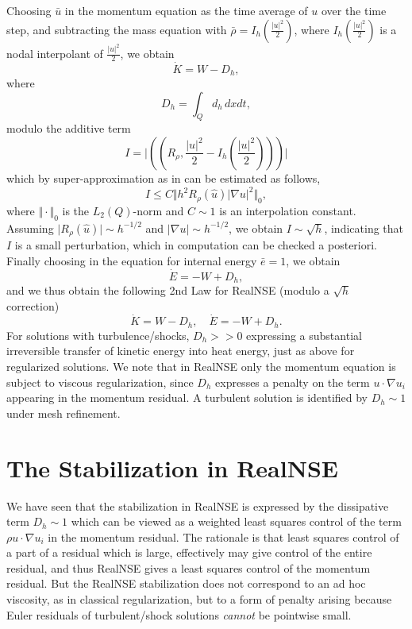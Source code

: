 Choosing $\bar u$ in the momentum equation as
the time average of $u$ over the time step, and subtracting
the mass equation with $\bar\rho =I_h(\frac{\vert u\vert^2}{2})$, where
$I_h(\frac{\vert u\vert^2}{2})$ is a nodal interpolant
of $\frac{\vert u\vert^2}{2}$, we obtain 
\begin{equation}\label{2ndlawRealNSEK}
\dot K = W-D_h,
\end{equation}
where 
\begin{equation}
D_h=\int_Qd_h\, dxdt,
\end{equation}
modulo the additive term
\[
I=\vert ((R_\rho ,\frac{\vert u\vert^2}{2}-I_h(\frac{\vert u\vert^2}{2})))\vert
\]
which  by super-approximation as in \cite{ambsflow}
can be estimated as follows, 
\[
I\le C\Vert h^2 R_\rho (\hat u)\vert\nabla u\vert^2\Vert_0,
\]
where $\Vert\cdot\Vert_0$ is the $L_2(Q)$-norm and $C\sim 1$ 
is an interpolation constant.
Assuming $\vert R_\rho (\hat u)\vert\sim h^{-1/2}$ and  
$\vert\nabla u\vert\sim h^{-1/2}$,
we obtain $I\sim \sqrt{h}$, indicating that
$I$ is a small perturbation, which in computation can be
checked a posteriori. Finally choosing in the equation for 
internal energy $\bar e=1$, we obtain 
\[
\dot E=-W+D_h,
\]
and we thus obtain the following 2nd Law for RealNSE 
(modulo a $\sqrt{h}$ correction)
\begin{equation}\label{2ndlawRealNSE}
\dot K = W-D_h,\quad\dot E=-W+D_h.
\end{equation}
For solutions with turbulence/shocks, $D_h>>0$ expressing a substantial 
irreversible transfer of kinetic energy into heat energy, 
just as above for regularized
solutions. We note that in RealNSE only the momentum equation is
subject to viscous regularization, since $D_h$ expresses a 
penalty on the term $u\cdot\nabla u_i$ appearing in the momentum residual.
A turbulent solution is identified by $D_h\sim 1$ under mesh refinement.  

\section{The Stabilization in RealNSE}

We have seen that the stabilization in RealNSE is expressed 
by the dissipative term $D_h\sim 1$ 
which can be viewed as a weighted least squares control
of the term $\rho u\cdot\nabla u_i$ in the momentum residual.
The rationale is that least squares control of a  
part of a residual which is large, effectively may 
give control of the entire residual, and thus RealNSE 
gives a least squares control of the 
momentum residual. But the RealNSE stabilization does not correspond
to an ad hoc viscosity, as in classical regularization, but to
a form of penalty arising because Euler residuals 
of turbulent/shock solutions \emph{cannot} be pointwise small. 

